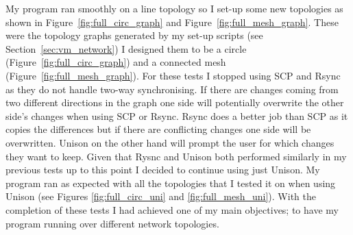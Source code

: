 \documentclass[12pt]{article}
\begin{document}
My program ran smoothly on a line topology so I
set-up some new topologies as shown in 
Figure~\ref{fig:full_circ_graph} and Figure~\ref{fig:full_mesh_graph}.
These were the topology graphs generated by my set-up scripts (see
Section~\ref{sec:vm_network}) I designed them to be a circle
(Figure~\ref{fig:full_circ_graph}) and a connected mesh
(Figure~\ref{fig:full_mesh_graph}). 
For these tests I stopped using SCP and Rsync as they do
not handle two-way synchronising. If there
are changes coming from two different directions
in the graph one side will potentially overwrite
the other side's changes when using SCP or Rsync.
Rsync does a better job than SCP as it copies the
differences but if there are conflicting changes
one side will be overwritten. Unison on the other
hand will prompt the user for which changes they
want to keep. Given that Rysnc and Unison both
performed similarly in my previous tests up to
this point I decided to continue using just Unison.
My program ran as expected with all the topologies that
I tested it on when using Unison (see Figures
\ref{fig:full_circ_uni} and \ref{fig:full_mesh_uni}).
With the completion of these tests I had achieved
one of my main objectives; to have my program running over
different network topologies.
\end{document}
